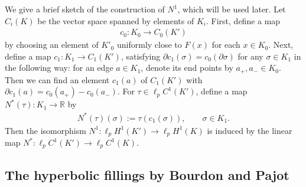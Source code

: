 \documentclass[AHL,Unicode,longabstracts,published]{cedram}
\newcommand{\br}{\mathbb{R}}
\begin{document}
We give a brief sketch of the construction of $N^1$, which will be used later. Let $C_i(K)$ be the vector space spanned by elements of $K_i$. First, define a map
\begin{align}\label{c0}
c_0:K_0\rightarrow C_0(K')
\end{align}
by choosing an element of $K'_0$ uniformly close to $F(x)$ for each $x\in K_0$. Next, define a map $c_1:K_1\rightarrow C_1(K')$, satisfying $\partial c_1(\sigma)=c_0(\partial\sigma)$ for any $\sigma\in K_1$ in the following way: for an edge $a\in K_1$, denote its end points by $a_{+},a_{-}\in K_0$. Then we can find an element $c_1(a)$ of $C_1(K')$ with $\partial c_1(a)=c_0(a_{+})-c_0(a_{-})$. For $\tau\in\ell_pC^1(K')$, define a map $N^*(\tau):K_1\rightarrow\br$ by
\begin{align}\label{n*}
N^*(\tau)(\sigma):=\tau(c_1(\sigma)),\qquad \sigma\in K_1.
\end{align}
Then the isomorphism $N^1:\ell_pH^1(K')\rightarrow\ell_pH^1(K)$ is induced by the linear map \newline
$N^*:\ell_pC^1(K')\rightarrow\ell_pC^1(K)$.

\subsection{The hyperbolic fillings by Bourdon and Pajot}
\end{document}

